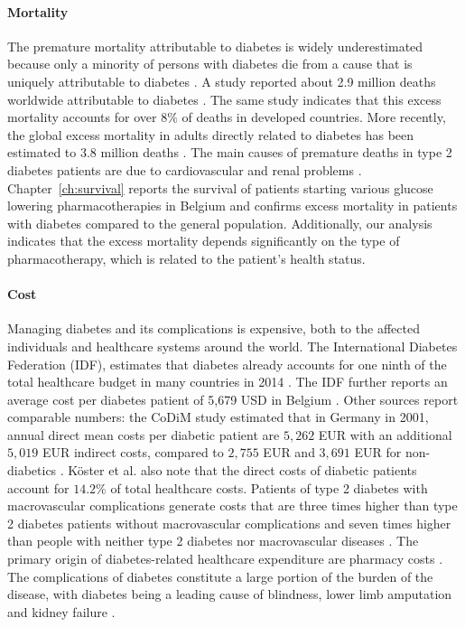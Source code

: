 \paragraph{Mortality} 
The premature mortality attributable to diabetes is widely underestimated because only a minority of persons with diabetes die from a cause that is uniquely attributable to diabetes \citep{beulens2010global}. A study reported about 2.9 million deaths worldwide attributable to diabetes \citep{roglic2005burden}. The same study indicates that this excess mortality accounts for over $8\%$ of deaths in developed countries. More recently, the global excess mortality in adults directly related to diabetes has been estimated to 3.8 million deaths \citep{beulens2010global}. The main causes of premature deaths in type 2 diabetes patients are due to cardiovascular and renal problems \citep{morrish2001mortality, beulens2010global}. 
Chapter~\ref{ch:survival} reports the survival of patients starting various glucose lowering pharmacotherapies in Belgium and confirms excess mortality in patients with diabetes compared to the general population. Additionally, our analysis indicates that the excess mortality depends significantly on the type of pharmacotherapy, which is related to the patient's health status.


\paragraph{Cost} Managing diabetes and its complications is expensive, both to the affected individuals and healthcare systems around the world.  The International Diabetes Federation (IDF), estimates that diabetes already accounts for one ninth of the total healthcare budget in many countries in 2014 \citep{IDFfacts}. The IDF further reports an average cost per diabetes patient of 5,679 USD in Belgium \citep{IDFatlas}. Other sources report comparable numbers: the CoDiM study estimated that in Germany in 2001, annual direct mean costs per diabetic patient are $5,262$ EUR with an additional $5,019$ EUR indirect costs, compared to $2,755$ EUR and $3,691$ EUR for non-diabetics \citep{koster2006cost}. K\"oster et al. \citep{koster2006cost} also note that the direct costs of diabetic patients account for $14.2\%$ of total healthcare costs. Patients of type 2 diabetes with macrovascular complications generate costs that are three times higher than type 2 diabetes patients without macrovascular complications and seven times higher than people with neither type 2 diabetes nor macrovascular diseases \citep{beulens2010global}. The primary origin of diabetes-related healthcare expenditure are pharmacy costs \citep{nichols2002impact, gandra2006total}. The complications of diabetes constitute a large portion of the burden of the disease, with diabetes being a leading cause of blindness, lower limb amputation and kidney failure \citep{beulens2010global}. 


